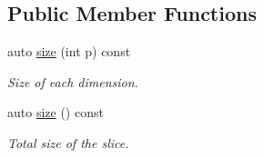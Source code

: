 \subsection*{Public Member Functions}
\begin{DoxyCompactItemize}
\item 
auto \hyperlink{classcnt_1_1help_1_1Slice_a0357feeda100757b1202ee9e24021ed0}{size} (int p) const 
\begin{DoxyCompactList}\small\item\em Size of each dimension. \end{DoxyCompactList}\item 
auto \hyperlink{classcnt_1_1help_1_1Slice_ae3af5fdf7436c2de291611e68495b471}{size} () const 
\begin{DoxyCompactList}\small\item\em Total size of the slice. \end{DoxyCompactList}\end{DoxyCompactItemize}
{\bf }\par
